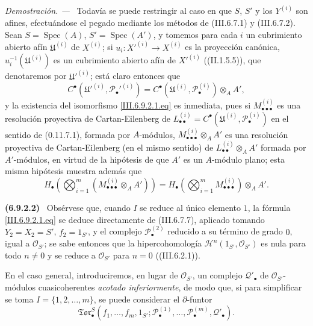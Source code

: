 \documentclass[10pt,oneside]{book}
\newcommand{\sref}[2][]{\textup{(#2)}}
\newenvironment{env}[1][]{\par\medskip\noindent\textbf{(#1)}\ }{\par}
\newenvironment{proof}{\par\medskip\noindent\textit{Demostración. ---\ }}{\par}
\begin{document}
\begin{proof}
Todavía se puede restringir al caso en que $S$, $S'$ y los $Y^{(i)}$ son
afines, efectuándose el pegado mediante los métodos de \sref{III.6.7.1} y
\sref{III.6.7.2}. Sean $S=\operatorname{Spec}(A)$,
$S'=\operatorname{Spec}(A')$, y tomemos para cada $i$ un cubrimiento abierto
afín $\mathfrak U^{(i)}$ de $X^{(i)}$; si
$u_i:X'^{(i)}\to X^{(i)}$ es la proyección canónica,
$u_i^{-1}(\mathfrak U^{(i)})$ es un cubrimiento abierto afín de
$X'^{(i)}$ (\sref[II]{II.1.5.5}), que denotaremos por
$\mathfrak U'^{(i)}$; está claro entonces que
\[
  C^\bullet(\mathfrak U'^{(i)},\mathscr P_\bullet'^{(i)})
  =C^\bullet(\mathfrak U^{(i)},\mathscr P_\bullet^{(i)})\otimes_A A',
\]
y la existencia del isomorfismo \eqref{III.6.9.2.1.eq} es inmediata, pues si
$M_{\bullet\bullet\bullet}^{(i)}$ es una resolución proyectiva de
Cartan-Eilenberg de
$L_{\bullet\bullet}^{(i)}=C^\bullet(\mathfrak U^{(i)},
\mathscr P_\bullet^{(i)})$ en el sentido de \sref[0]{0.11.7.1}, formada por
$A$-módulos, $M_{\bullet\bullet\bullet}^{(i)}\otimes_A A'$ es una resolución
proyectiva de Cartan-Eilenberg (en el mismo sentido) de
$L_{\bullet\bullet}^{(i)}\otimes_A A'$ formada por $A'$-módulos, en virtud
de la hipótesis de que $A'$ es un $A$-módulo plano; esta misma hipótesis
muestra además que
\[
  H_\bullet\left(
    \bigotimes_{i=1}^m
    (M_{\bullet\bullet\bullet}^{(i)}\otimes_A A')
  \right)
  =H_\bullet\left(
    \bigotimes_{i=1}^m M_{\bullet\bullet\bullet}^{(i)}
  \right)\otimes_A A'.
\]
\end{proof}

\begin{env}[6.9.2.2]
\label{III.6.9.2.2}
Obsérvese que, cuando $I$ se reduce al único elemento $1$, la fórmula
\eqref{III.6.9.2.1.eq} se deduce directamente de \sref{III.6.7.7}, aplicado
tomando $Y_2=X_2=S'$, $f_2=1_{S'}$, y el complejo
$\mathscr P_\bullet^{(2)}$ reducido a su término de grado $0$, igual a
$\mathscr O_{S'}$; se sabe entonces que la hipercohomología
$\mathscr H^n(1_{S'},\mathscr O_{S'})$ es nula para todo $n\ne0$ y se reduce
a $\mathscr O_{S'}$ para $n=0$ (\sref{III.6.2.1}).
\end{env}

En el caso general, introduciremos, en lugar de $\mathscr O_{S'}$, un
complejo $\mathscr Q'_\bullet$ de $\mathscr O_{S'}$-módulos cuasicoherentes
\emph{acotado inferiormente}, de modo que, si para simplificar se toma
$I=\{1,2,\ldots,m\}$, se puede considerar el $\partial$-funtor
\[
  \mathfrak{Tor}_\bullet^S
  (f_1,\ldots,f_m,1_{S'};
   \mathscr P_\bullet^{(1)},\ldots,\mathscr P_\bullet^{(m)},
   \mathscr Q'_\bullet).
\]
\end{document}
